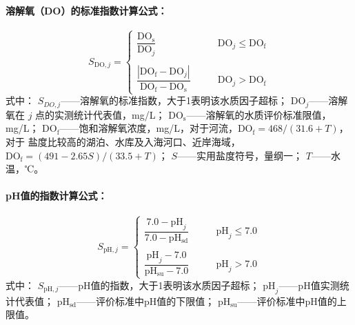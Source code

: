 \paragraph*{溶解氧（DO）的标准指数计算公式：}
\begin{equation} \label{eq:DO}
    S_{\mathrm{DO},j} = 
    \begin{cases}
        \dfrac{\mathrm{DO_s}}{\mathrm{DO}_j} &\qquad \mathrm{DO}_j \leqslant \mathrm{DO_f} \\
        & \\
        \dfrac{\left\lvert \mathrm{DO_f}-\mathrm{DO}_j \right\rvert}{\mathrm{DO_f}-\mathrm{DO_s}} &\qquad \mathrm{DO}_j > \mathrm{DO_f}
    \end{cases}
\end{equation}
式中：
$S_{DO,j}$——溶解氧的标准指数，大于1表明该水质因子超标；
\newline\phantom{式中：}$\mathrm{DO}_j$——溶解氧在 $j$ 点的实测统计代表值，mg/L；
\newline\phantom{式中：}$\mathrm{DO_s}$——溶解氧的水质评价标准限值，mg/L；
\newline\phantom{式中：}$\mathrm{DO_f}$——饱和溶解氧浓度，mg/L，对于河流，$\mathrm{DO_f}=468/(31.6+T)$，对于
\newline{}盐度比较高的湖泊、水库及入海河口、近岸海域，
\newline{}$\mathrm{DO_f}=(491-2.65S)/(33.5+T)$；
\newline\phantom{式中：}$S$——实用盐度符号，量纲一；
\newline\phantom{式中：}$T$——水温，℃。

\paragraph*{pH值的指数计算公式：}
\begin{equation} \label{eq:pH}
    S_{\mathrm{pH},j} = 
    \begin{cases}
        \dfrac{7.0-\mathrm{pH}_j}{7.0-\mathrm{pH_{sd}}} &\qquad \mathrm{pH}_j \leqslant 7.0 \\
        & \\
        \dfrac{\mathrm{pH}_j-7.0}{\mathrm{pH_{su}}-7.0} &\qquad \mathrm{pH}_j > 7.0
    \end{cases}
\end{equation}
式中：
$S_{\mathrm{pH},j}$——pH值的指数，大于1表明该水质因子超标；
\newline\phantom{式中：}$\mathrm{pH}_j$——pH值实测统计代表值；
\newline\phantom{式中：}$\mathrm{pH_{sd}}$——评价标准中pH值的下限值；
\newline\phantom{式中：}$\mathrm{pH_{su}}$——评价标准中pH值的上限值。

